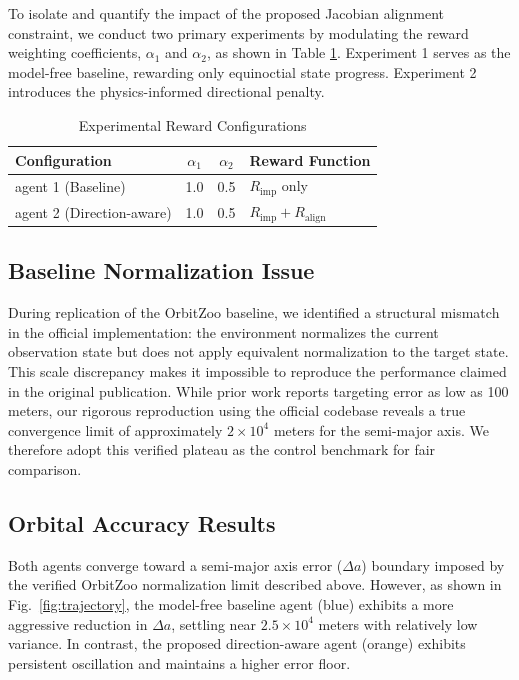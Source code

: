 \documentclass[paper]{ieice}
\begin{document}
To isolate and quantify the impact of the proposed Jacobian alignment constraint, we conduct two primary experiments by modulating the reward weighting coefficients, $\alpha_1$ and $\alpha_2$, as shown in Table \ref{tab:exp_setup}. Experiment 1 serves as the model-free baseline, rewarding only equinoctial state progress. Experiment 2 introduces the physics-informed directional penalty.

\begin{table}[tb]
\caption{Experimental Reward Configurations}
\label{tab:exp_setup}
\begin{center}
\begin{tabular}{|l|c|c|l|}
\hline
\textbf{Configuration} & $\alpha_1$ & $\alpha_2$ & \textbf{Reward Function} \\
\hline
agent 1 (Baseline) & 1.0 & 0.5 & $R_{\mathrm{imp}}$ only \\
agent 2 (Direction-aware) & 1.0 & 0.5 & $R_{\mathrm{imp}} + R_{\mathrm{align}}$ \\
\hline
\end{tabular}
\end{center}
\end{table}

\subsection{Baseline Normalization Issue}

During replication of the OrbitZoo baseline, we identified a structural mismatch in the official implementation: the environment normalizes the current observation state but does not apply equivalent normalization to the target state. This scale discrepancy makes it impossible to reproduce the performance claimed in the original publication. While prior work reports targeting error as low as 100 meters, our rigorous reproduction using the official codebase reveals a true convergence limit of approximately $2 \times 10^4$ meters for the semi-major axis. We therefore adopt this verified plateau as the control benchmark for fair comparison.

\subsection{Orbital Accuracy Results}

Both agents converge toward a semi-major axis error ($\Delta a$) boundary imposed by the verified OrbitZoo normalization limit described above. However, as shown in Fig.~\ref{fig:trajectory}, the model-free baseline agent (blue) exhibits a more aggressive reduction in $\Delta a$, settling near $2.5 \times 10^4$ meters with relatively low variance. In contrast, the proposed direction-aware agent (orange) exhibits persistent oscillation and maintains a higher error floor. 
\end{document}
